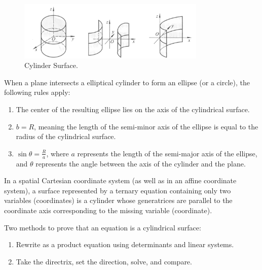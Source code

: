 \documentclass[11pt]{../../TexTemplate/elegantbook} %
\begin{document}
\begin{figure}[h]
    \centering
    \includegraphics[width=0.8\textwidth]{img/Cylinder.png}
    \caption{Cylinder Surface.}
    \label{fig:CylinderSurface}
\end{figure}

When a plane intersects a elliptical cylinder to form an ellipse (or a circle), the following rules apply:
\begin{enumerate}
    \item  The center of the resulting ellipse lies on the axis of the cylindrical surface.
    \item  \(b = R\), meaning the length of the semi-minor axis of the ellipse is equal to the radius of the cylindrical surface.
    \item  \(\sin \theta = \frac{R}{a}\), where \(a\) represents the length of the semi-major axis of the ellipse, 
        and \(\theta\) represents the angle between the axis of the cylinder and the plane.
\end{enumerate}


\vspace{0.7cm}
\begin{theorem}
    In a spatial Cartesian coordinate system (as well as in an affine coordinate system), 
    a surface represented by a ternary equation containing only two variables (coordinates) 
    is a cylinder whose generatrices are parallel to the coordinate axis corresponding to the missing variable (coordinate).
\end{theorem}

\begin{example}
    
\end{example}

\begin{note}
    Two methods to prove that an equation is a cylindrical surface: 
    \begin{enumerate}
        \item Rewrite as a product equation using determinants and linear systems.
        \item Take the directrix, set the direction, solve, and compare.
    \end{enumerate}
\end{note}
\end{document}
